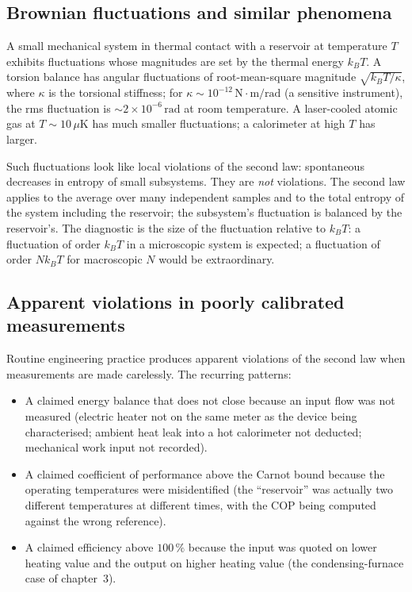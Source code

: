 \subsection{Brownian fluctuations and similar phenomena}

A small mechanical system in thermal contact with a reservoir at
temperature $T$ exhibits fluctuations whose magnitudes are set by
the thermal energy $k_B T$. A torsion balance has angular
fluctuations of root-mean-square magnitude $\sqrt{k_B T/\kappa}$,
where $\kappa$ is the torsional stiffness; for $\kappa \sim 10^{-12}\,
\text{N}\cdot\text{m}/\text{rad}$ (a sensitive instrument), the rms
fluctuation is $\sim 2 \times 10^{-6}\,\text{rad}$ at room
temperature. A laser-cooled atomic gas at $T \sim 10\,\mu\text{K}$ has
much smaller fluctuations; a calorimeter at high $T$ has larger.

Such fluctuations look like local violations of the second law:
spontaneous decreases in entropy of small subsystems. They are
\emph{not} violations. The second law applies to the average over
many independent samples and to the total entropy of the system
including the reservoir; the subsystem's fluctuation is balanced by
the reservoir's. The diagnostic is the size of the fluctuation
relative to $k_B T$: a fluctuation of order $k_B T$ in a microscopic
system is expected; a fluctuation of order $N k_B T$ for macroscopic
$N$ would be extraordinary.

\subsection{Apparent violations in poorly calibrated measurements}

Routine engineering practice produces apparent violations of the
second law when measurements are made carelessly. The recurring
patterns:

\begin{itemize}[leftmargin=*]
  \item A claimed energy balance that does not close because an input
    flow was not measured (electric heater not on the same meter as
    the device being characterised; ambient heat leak into a hot
    calorimeter not deducted; mechanical work input not recorded).
  \item A claimed coefficient of performance above the Carnot bound
    because the operating temperatures were misidentified (the
    ``reservoir'' was actually two different temperatures at different
    times, with the COP being computed against the wrong reference).
  \item A claimed efficiency above $100\,\%$ because the input was
    quoted on lower heating value and the output on higher heating
    value (the condensing-furnace case of chapter~3).
\end{itemize}

